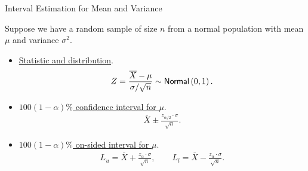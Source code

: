 \begin{frame}{Interval Estimation for Mean and Variance}

\justifying
Suppose we have a random sample of size $n$ from a normal population with  mean $\mu$ and  variance $\sigma^2$.
\begin{itemize}
	\item \underline{Statistic and distribution}.
	\begin{align*}
	Z = \frac{\overline{X} - \mu}{\sigma / \sqrt{n}} \sim \mathsf{Normal}\left(0, 1 \right).
	\end{align*}
	\item \underline{$100(1-\alpha)\%$ confidence interval for $\mu$}.
	\begin{align*}
	\overline{X} \pm \frac{z_{\alpha/2}\cdot\sigma}{\sqrt{n}}.
	\end{align*}
	\item \underline{$100(1-\alpha)\%$ on-sided interval for $\mu$}.
	\begin{align*}
	L_u = \overline{X} + \frac{z_{\alpha}\cdot\sigma}{\sqrt{n}}, \qquad L_l = \overline{X} - \frac{z_{\alpha}\cdot \sigma}{\sqrt{n}}.
	\end{align*}
\end{itemize}

\end{frame}
